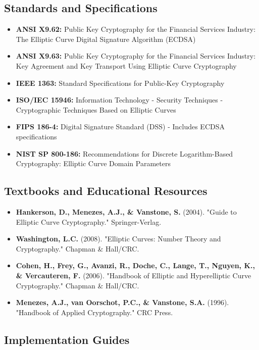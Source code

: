 \documentclass[11pt,a4paper]{article}
\begin{document}
\subsection{Standards and Specifications}

\begin{itemize}
    \item \textbf{ANSI X9.62:} Public Key Cryptography for the Financial Services Industry: The Elliptic Curve Digital Signature Algorithm (ECDSA)
    \item \textbf{ANSI X9.63:} Public Key Cryptography for the Financial Services Industry: Key Agreement and Key Transport Using Elliptic Curve Cryptography
    \item \textbf{IEEE 1363:} Standard Specifications for Public-Key Cryptography
    \item \textbf{ISO/IEC 15946:} Information Technology - Security Techniques - Cryptographic Techniques Based on Elliptic Curves
    \item \textbf{FIPS 186-4:} Digital Signature Standard (DSS) - Includes ECDSA specifications
    \item \textbf{NIST SP 800-186:} Recommendations for Discrete Logarithm-Based Cryptography: Elliptic Curve Domain Parameters
\end{itemize}

\subsection{Textbooks and Educational Resources}

\begin{itemize}
    \item \textbf{Hankerson, D., Menezes, A.J., \& Vanstone, S.} (2004). "Guide to Elliptic Curve Cryptography." Springer-Verlag.
    \item \textbf{Washington, L.C.} (2008). "Elliptic Curves: Number Theory and Cryptography." Chapman \& Hall/CRC.
    \item \textbf{Cohen, H., Frey, G., Avanzi, R., Doche, C., Lange, T., Nguyen, K., \& Vercauteren, F.} (2006). "Handbook of Elliptic and Hyperelliptic Curve Cryptography." Chapman \& Hall/CRC.
    \item \textbf{Menezes, A.J., van Oorschot, P.C., \& Vanstone, S.A.} (1996). "Handbook of Applied Cryptography." CRC Press.
\end{itemize}

\subsection{Implementation Guides}
\end{document}
